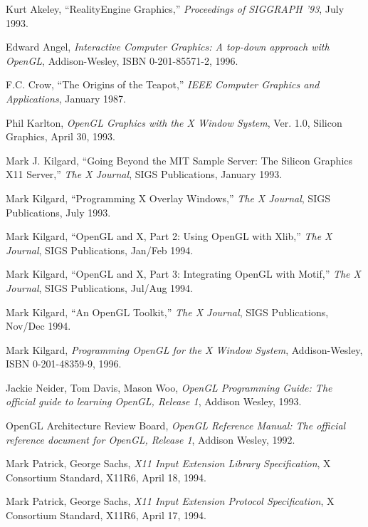 \documentclass[titlepage,twoside]{article}
\begin{document}
\pagebreak


\begin{thebibliography}{99}

Kurt Akeley, ``RealityEngine Graphics,'' {\em Proceedings of
SIGGRAPH '93}, July 1993.

Edward Angel, {\em Interactive Computer Graphics: A top-down approach
with OpenGL}, Addison-Wesley, ISBN 0-201-85571-2, 1996.

F.C. Crow, ``The Origins of the Teapot,'' {\em IEEE Computer Graphics
and Applications}, January 1987.

 Phil Karlton, {\em OpenGL Graphics with the X
Window System}, Ver. 1.0, Silicon Graphics, April 30, 1993.

 Mark J. Kilgard, ``Going Beyond the MIT Sample
Server:  The Silicon Graphics X11 Server,'' {\em The X Journal}, SIGS
Publications, January 1993.

Mark Kilgard, ``Programming X Overlay Windows,'' {\em The X Journal},
SIGS Publications, July 1993.

Mark Kilgard, ``OpenGL and X, Part 2: Using OpenGL with Xlib,''
{\em The X Journal}, SIGS Publications, Jan/Feb 1994.

Mark Kilgard, ``OpenGL and X, Part 3: Integrating OpenGL with Motif,''
{\em The X Journal}, SIGS Publications, Jul/Aug 1994.

Mark Kilgard, ``An OpenGL Toolkit,''
{\em The X Journal}, SIGS Publications, Nov/Dec 1994.

Mark Kilgard, {\em Programming OpenGL for the X Window System},
Addison-Wesley, ISBN 0-201-48359-9, 1996.

Jackie Neider, Tom Davis, Mason Woo, {\em OpenGL Programming Guide:
The official guide to learning OpenGL, Release 1}, Addison Wesley, 1993.

OpenGL Architecture Review Board, {\em OpenGL Reference Manual:  The
official reference document for OpenGL, Release 1}, Addison Wesley, 1992.

Mark Patrick, George Sachs, {\em X11 Input Extension Library Specification}, 
X Consortium Standard, X11R6, April 18, 1994.

Mark Patrick, George Sachs, {\em X11 Input Extension Protocol Specification}, 
X Consortium Standard, X11R6, April 17, 1994.


\end{thebibliography}
\end{document}
